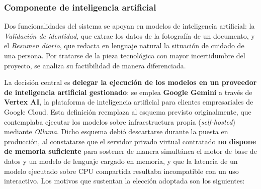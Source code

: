 \documentclass[a4paper,12pt]{article}
\begin{document}
    \subsubsection{Componente de inteligencia artificial}
    \par Dos funcionalidades del sistema se apoyan en modelos de inteligencia artificial: la \textit{Validación de identidad}, que extrae los datos de la fotografía de un documento, y el \textit{Resumen diario}, que redacta en lenguaje natural la situación de cuidado de una persona. Por tratarse de la pieza tecnológica con mayor incertidumbre del proyecto, se analiza su factibilidad de manera diferenciada.
    \par La decisión central es \textbf{delegar la ejecución de los modelos en un proveedor de inteligencia artificial gestionado}: se emplea \textbf{Google Gemini} a través de \textbf{Vertex AI}, la plataforma de inteligencia artificial para clientes empresariales de Google Cloud. Esta definición reemplaza al esquema previsto originalmente, que contemplaba ejecutar los modelos sobre infraestructura propia (\textit{self-hosted}) mediante \textit{Ollama}. Dicho esquema debió descartarse durante la puesta en producción, al constatarse que el servidor privado virtual contratado \textbf{no dispone de memoria suficiente} para sostener de manera simultánea el motor de base de datos y un modelo de lenguaje cargado en memoria, y que la latencia de un modelo ejecutado sobre CPU compartida resultaba incompatible con un uso interactivo. Los motivos que sustentan la elección adoptada son los siguientes:
\end{document}
